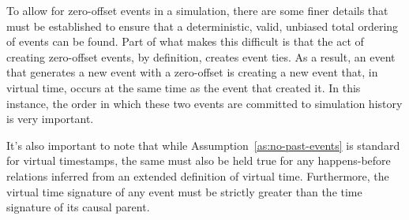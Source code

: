 \documentclass[nonacm,sigconf]{acmart}
\begin{document}
To allow for zero-offset events in a simulation, there are some finer details that must be established to ensure that a deterministic, valid, unbiased total ordering of events can be found. Part of what makes this difficult is that the act of creating zero-offset events, by definition, creates event ties. As a result, an event that generates a new event with a zero-offset is creating a new event that, in virtual time, occurs at the same time as the event that created it. In this instance, the order in which these two events are committed to simulation history is very important.


It's also important to note that while Assumption~\ref{as:no-past-events} is standard for virtual timestamps, the same must also be held true for any happens-before relations inferred from an extended definition of virtual time. Furthermore, the virtual time signature of any event must be strictly greater than the time signature of its causal parent.


\end{document}
